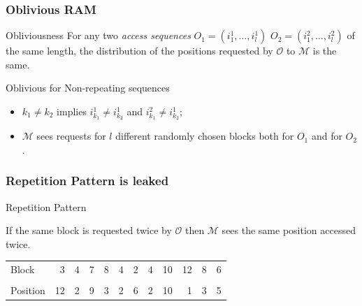 \documentclass[]{beamer}
\newcommand{\owner}{\mathcal{O}}
\newcommand{\manager}{\mathcal{M}}
\begin{document}
{\begin{frame}
\frametitle{Oblivious RAM}

\begin{block}{Obliviousness}
For any two {\em access sequences}
$O_1=(i_1^1,\ldots,i_l^1)$ 
$O_2=(i_1^2,\ldots,i_l^2)$ of the same length,
the distribution of the positions requested by $\owner$ to $\manager$ is the same.
\end{block}
\pause

\vfill

\begin{block}{Oblivious for Non-repeating sequences}
\begin{itemize}
\item $k_1\ne k_2$ implies $i_{k_1}^1\ne i_{k_2}^1$ and $i_{k_1}^2\ne i_{k_2}^1$;
\item $\manager$ sees requests for $l$ different randomly chosen blocks
both for $O_1$ and for $O_2$.
\end{itemize}
\end{block}
\end{frame}

\begin{frame}
\frametitle{Repetition Pattern is leaked}

\begin{block}{Repetition Pattern}

If the same block is requested twice by $\owner$ 
then $\manager$ sees the same position accessed twice.

\vskip 1cm 
\begin{tabular}{lrrrrrrrrrrr}
{\color{blue} Block}   & 3  & {\color{red} 4} & 7 & {\color{brown} 8} & {\color{red} 4} & 2 & {\color{red} 4}  & 10 & 12 & {\color{brown} 8} & 6 \\
\\
{\color{magenta} Position} & 12 & {\color{red} 2} & 9 & {\color{brown} 3} & {\color{red} 2} & 6 & {\color{red} 2}  & 10 & 1  & {\color{brown} 3} & 5\\
\end{tabular}

\end{block}
\end{frame}

}
\end{document}
